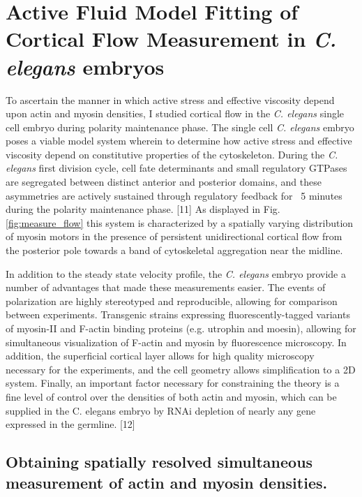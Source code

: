 \section{Active Fluid Model Fitting of Cortical Flow Measurement in \textit{C. elegans} embryos}

To ascertain the manner in which active stress and effective viscosity depend upon
actin and myosin densities, I studied cortical flow in the \textit{C. elegans}
single cell embryo during polarity maintenance phase. The single cell \textit{C. elegans}
embryo poses a viable model system wherein to determine how active stress and
effective viscosity depend on constitutive properties of the cytoskeleton. During
the \textit{C. elegans} first division cycle, cell fate determinants and small regulatory
GTPases are segregated between distinct anterior and posterior domains, and these 
asymmetries are actively sustained through regulatory feedback for ~5 minutes 
during the polarity maintenance phase. [11] As displayed in Fig. \ref{fig:measure_flow} this system is 
characterized by a spatially varying distribution of myosin motors 
in the presence of persistent unidirectional cortical flow from the posterior pole 
towards a band of cytoskeletal aggregation near the midline.

In addition to the steady state velocity profile, the \textit{C. elegans} embryo provide a number of
advantages that made these measurements easier. The events of polarization are highly
stereotyped and reproducible, allowing for comparison between experiments. Transgenic strains
expressing fluorescently-tagged variants of myosin-II and F-actin binding proteins (e.g. utrophin and
moesin), allowing for simultaneous visualization of F-actin and myosin by fluorescence microscopy.
In addition, the superficial cortical layer allows for high quality microscopy necessary for the
experiments, and the cell geometry allows simplification to a 2D system. Finally, an important factor
necessary for constraining the theory is a fine level of control over the densities of both actin and
myosin, which can be supplied in the C. elegans embryo by RNAi depletion of nearly any gene
expressed in the germline. [12]



\subsection{Obtaining spatially resolved simultaneous measurement of actin and myosin densities.}

